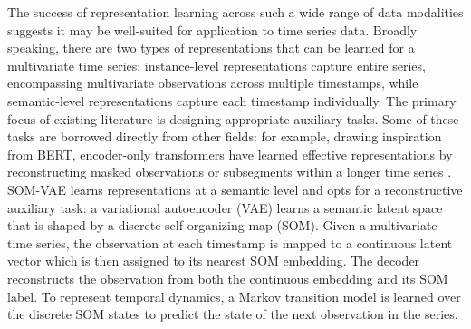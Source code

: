 \documentclass{article}
\begin{document}
The success of representation learning across such a wide range of data modalities suggests it may be well-suited for application to time series data. Broadly speaking, there are two types of representations that can be learned for a multivariate time series: instance-level representations capture entire series, encompassing multivariate observations across multiple timestamps, while semantic-level representations capture each timestamp individually. The primary focus of existing literature is designing appropriate auxiliary tasks. Some of these tasks are borrowed directly from other fields: for example, drawing inspiration from BERT, encoder-only transformers have learned effective representations by reconstructing masked observations or subsegments within a longer time series \cite{zerveas21-tsbert}. SOM-VAE \cite{fortuin19-somvae} learns representations at a semantic level and opts for a reconstructive auxiliary task: a variational autoencoder (VAE) learns a semantic latent space that is shaped by a discrete self-organizing map (SOM). Given a multivariate time series, the observation at each timestamp is mapped to a continuous latent vector which is then assigned to its nearest SOM embedding. The decoder reconstructs the observation from both the continuous embedding and its SOM label. To represent temporal dynamics, a Markov transition model is learned over the discrete SOM states to predict the state of the next observation in the series. 
\end{document}

